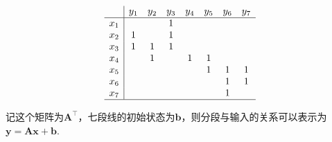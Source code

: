 \begin{example}{}{}
  \[
    \begin{array}{c|ccccccc}
          & y_1 & y_2 & y_3 & y_4 & y_5 & y_6 & y_7 \\\hline
      x_1 &     &     &  1  &     &     &     &     \\
      x_2 &  1  &     &  1  &     &     &     &     \\
      x_3 &  1  &  1  &  1  &     &     &     &     \\
      x_4 &     &  1  &     &  1  &  1  &     &     \\
      x_5 &     &     &     &     &  1  &  1  &  1  \\
      x_6 &     &     &     &     &     &  1  &  1  \\
      x_7 &     &     &     &     &     &  1  &     \\\hline
    \end{array}
  \]



  记这个矩阵为$\mathbf{A}^\top$，七段线的初始状态为$\mathbf{b}$，则分段与输入的关系可以表示为$\mathbf{y}=\mathbf{A}\mathbf{x}+\mathbf{b}$.

\end{example}

